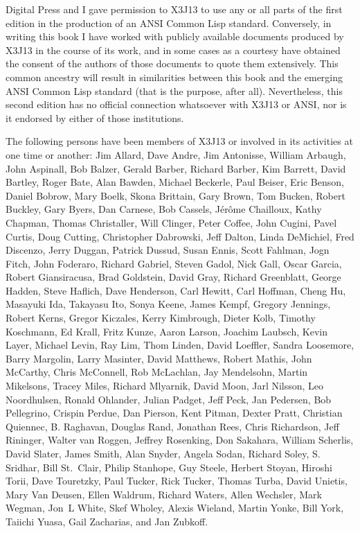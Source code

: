 Digital Press and I gave permission to X3J13 to use any or all parts
of the first edition in the production of an ANSI Common Lisp standard.
Conversely, in writing this book I have worked with publicly available
documents produced by X3J13 in the course of its work, and in some cases
as a courtesy have obtained the consent of the authors of those documents
to quote them extensively.  This common ancestry will result in similarities
between this book and the emerging ANSI Common Lisp standard (that is the
purpose, after all).  Nevertheless, this second edition 
has no official connection whatsoever
with X3J13 or ANSI, nor is it endorsed by either of those institutions.

The following persons have been members of X3J13 or involved in its
activities at one time or another:
Jim Allard, Dave Andre, Jim Antonisse, William Arbaugh, John
Aspinall, Bob Balzer, Gerald Barber, Richard Barber, Kim Barrett,
David Bartley, Roger Bate, Alan Bawden, Michael Beckerle, Paul
Beiser, Eric Benson, Daniel Bobrow, Mary Boelk, Skona Brittain, Gary
Brown, Tom Bucken, Robert Buckley, Gary Byers, Dan Carnese, Bob
Cassels, J\'er\^ome Chailloux, Kathy Chapman, Thomas Christaller,
Will Clinger, Peter Coffee, John Cugini, Pavel Curtis, Doug Cutting,
Christopher Dabrowski, Jeff Dalton, Linda DeMichiel, Fred Discenzo,
Jerry Duggan, Patrick Dussud, Susan Ennis, Scott Fahlman, Jogn Fitch,
John Foderaro, Richard Gabriel, Steven Gadol, Nick Gall, Oscar
Garcia, Robert Gian\-sira\-cusa, Brad Goldstein, David Gray, Richard
Greenblatt, George Hadden, Steve Haflich, Dave Henderson, Carl
Hewitt, Carl Hoffman, Cheng Hu, Masayuki Ida, Takayasu Ito, Sonya
Keene, James Kempf, Gregory Jennings, Robert Kerns, Gregor Kiczales,
Kerry Kimbrough, Dieter Kolb, Timothy Koschmann, Ed Krall, Fritz
Kunze, Aaron Larson, Joachim Laubsch, Kevin Layer, Michael Levin, Ray
Lim, Thom Linden, David Loeffler, Sandra Loosemore, Barry Margolin,
Larry Masinter, David Matthews, Robert Mathis, John McCarthy, Chris
McConnell, Rob McLachlan, Jay Mendelsohn, Martin Mikelsons, Tracey
Miles, Richard Mlyarnik, David Moon, Jarl Nilsson, Leo Noordhulsen,
Ronald Ohlander, Julian Padget, Jeff Peck, Jan Pedersen, Bob
Pellegrino, Crispin Perdue, Dan Pierson, Kent Pitman, Dexter Pratt,
Christian Quiennec, B. Raghavan, Douglas Rand, Jonathan Rees, Chris
Richardson, Jeff Rininger, Walter van Roggen, Jeffrey Rosenking,  Don
Sakahara, William Scherlis, David Slater, James Smith, Alan Snyder,
Angela Sodan, Richard Soley, S. Sridhar, Bill St.\ Clair, Philip
Stanhope, Guy Steele, Herbert Stoyan, Hiroshi Torii, Dave Touretzky,
Paul Tucker, Rick Tucker, Thomas Turba, David Unietis, Mary Van
Deusen, Ellen Waldrum, Richard Waters, Allen Wechsler, Mark Wegman,
Jon~L White, Skef Wholey, Alexis Wieland, Martin Yonke, Bill York,
Taiichi Yuasa, Gail Zacharias, and Jan Zubkoff.





